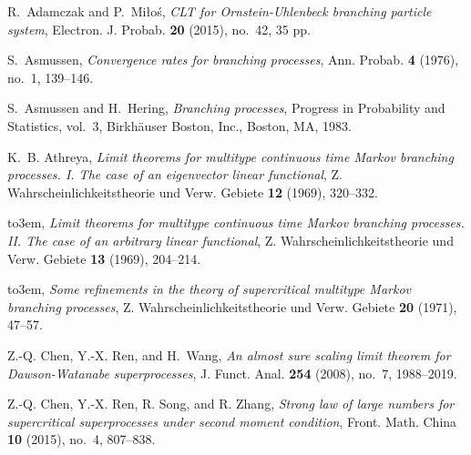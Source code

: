 \documentclass[12pt,a4paper]{amsart}
\theoremstyle{plain}
\theoremstyle{definition}
\numberwithin{equation}{section}
\begin{document}
\providecommand{\bysame}{\leavevmode\hbox to3em{\hrulefill}\thinspace}
\begin{thebibliography}{10}



R.~Adamczak and P.~Mi{\l}o\'{s}, \emph{C{LT} for {O}rnstein-{U}hlenbeck branching particle system},
  Electron. J. Probab. \textbf{20} (2015), no.~42, 35 pp.

  S.~Asmussen, \emph{Convergence rates for branching processes}, Ann.
  Probab.  \textbf{4} (1976), no.~1, 139--146.

S.~Asmussen and H.~Hering, \emph{Branching processes}, Progress in Probability
  and Statistics, vol.~3, Birkh\"{a}user Boston, Inc., Boston, MA, 1983.

K.~B. Athreya, \emph{Limit theorems for multitype continuous time {M}arkov
  branching processes. {I}. {T}he case of an eigenvector linear functional}, Z.
  Wahrscheinlichkeitstheorie und Verw. Gebiete \textbf{12} (1969), 320--332.

\bysame, \emph{Limit theorems for multitype continuous time {M}arkov branching
  processes. {II}. {T}he case of an arbitrary linear functional}, Z.
  Wahrscheinlichkeitstheorie und Verw. Gebiete \textbf{13} (1969), 204--214.

\bysame, \emph{Some refinements in the theory of supercritical multitype
  {M}arkov branching processes}, Z. Wahrscheinlichkeitstheorie und Verw.
  Gebiete \textbf{20} (1971), 47--57.


Z.-Q. Chen, Y.-X. Ren, and H.~Wang, \emph{An almost sure scaling limit theorem
  for {D}awson-{W}atanabe superprocesses}, J. Funct. Anal. \textbf{254} (2008),
  no.~7, 1988--2019.

  Z.-Q. Chen, Y.-X. Ren, R. Song, and R. Zhang,
 \emph{Strong law of large numbers for supercritical superprocesses under second moment condition}, Front. Math. China \textbf{10} (2015), no.~4, 807--838.
 

\end{thebibliography}
\end{document}
